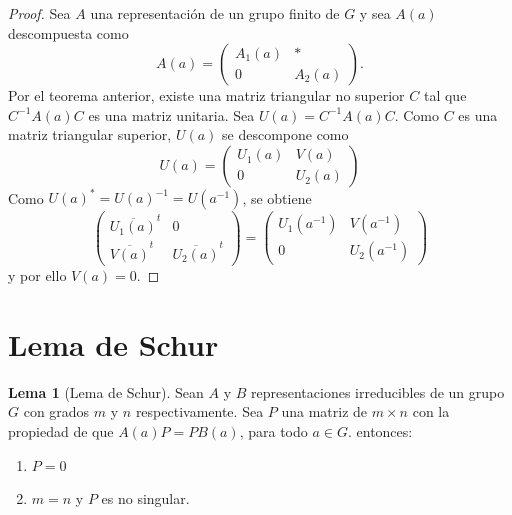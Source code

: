 \documentclass[12pt]{book}
\theoremstyle{definition}
\newtheorem{lemma}[theorem]{Lema}
\newcounter{in}
\newcounter{ini}
\begin{document}
\begin{proof}
  Sea $A$ una representación de un grupo finito de $G$ y sea $A(a)$
  descompuesta como
  \begin{equation}
    \label{eq:13}
        A(a)=
    \begin{pmatrix}
      A_{1}(a) & * \\ 
      0 & A_{2}(a)
    \end{pmatrix}.
  \end{equation}
  Por el teorema anterior, existe una matriz triangular no superior
  $C$ tal que $C^{-1}A(a)C$ es una matriz unitaria. Sea
  $U(a)=C^{-1}A(a)C$. Como $C$ es una matriz triangular superior,
  $U(a)$ se descompone como
  \begin{equation}
    \label{eq:14}
    U(a)=
    \begin{pmatrix}
      U_{1}(a) & V(a) \\ 
      0 & U_{2}(a)
    \end{pmatrix}
  \end{equation}  
  Como $U(a)^{*}=U(a)^{-1}=U(a^{-1})$, se obtiene
  \begin{equation}
    \label{eq:15}
    \begin{pmatrix}
      \overline{U_{1}(a)}^{t} & 0 \\ 
      \overline{V(a)}^{t} & \overline{U_{2}(a)}^{t}
    \end{pmatrix}
    =
    \begin{pmatrix}
      U_{1}(a^{-1}) & V(a^{-1}) \\ 
      0 & U_{2}(a^{-1})
    \end{pmatrix}
  \end{equation}
  y por ello $V(a)=0$.
\end{proof}

\section{Lema de Schur}
\label{sec:schur}

\begin{lemma}[Lema de Schur]
  \label{l3_1}
  Sean $A$ y $B$ representaciones
  irreducibles de un grupo $G$ con grados $m$ y $n$ respectivamente. Sea
  $P$ una matriz de $m \times n$ con la propiedad de que $A(a)P=PB(a)$, para
  todo $a \in G$.  entonces:
  \begin{enumerate}
  \item $P=0$
  \item $m=n$ y $P$ es no singular.
  \end{enumerate}
\end{lemma}
\end{document}
